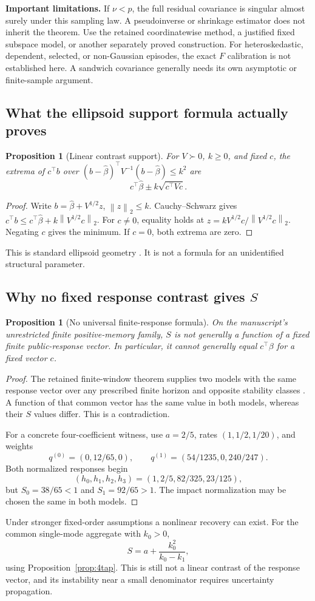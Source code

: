 \documentclass[11pt,a4paper]{article}
\newtheorem{proposition}[theorem]{Proposition}
\theoremstyle{definition}\newtheorem{definition}[theorem]{Definition}
\theoremstyle{remark}\newtheorem{remark}[theorem]{Remark}
\newcommand{\norm}[1]{\left\lVert#1\right\rVert}
\begin{document}
\textbf{Important limitations.} If $\nu<p$, the full residual covariance is singular almost surely under this sampling law. A pseudoinverse or shrinkage estimator does not inherit the theorem. Use the retained coordinatewise method, a justified fixed subspace model, or another separately proved construction. For heteroskedastic, dependent, selected, or non-Gaussian episodes, the exact $F$ calibration is not established here. A sandwich covariance generally needs its own asymptotic or finite-sample argument.

\subsection{What the ellipsoid support formula actually proves}
\begin{proposition}[Linear contrast support]\label{prop:support}
For $V\succ0$, $k\ge0$, and fixed $c$, the extrema of $c^\top b$ over
$(b-\hat\beta)^\top V^{-1}(b-\hat\beta)\le k^2$ are
\[
 c^\top\hat\beta\pm k\sqrt{c^\top Vc}.
\]
\end{proposition}
\begin{proof}
Write $b=\hat\beta+V^{1/2}z$, $\norm z_2\le k$. Cauchy--Schwarz gives
$c^\top b\le c^\top\hat\beta+k\norm{V^{1/2}c}_2$. For $c\ne0$, equality holds at
$z=kV^{1/2}c/\norm{V^{1/2}c}_2$. Negating $c$ gives the minimum. If $c=0$, both extrema are zero.
\end{proof}
This is standard ellipsoid geometry \cite{boyd}. It is not a formula for an unidentified structural parameter.

\subsection{Why no fixed response contrast gives \texorpdfstring{$S$}{S}}
\begin{proposition}[No universal finite-response formula]\label{prop:no-map}
On the manuscript's unrestricted finite positive-memory family, $S$ is not generally a function of a fixed finite public-response vector. In particular, it cannot generally equal $c^\top\beta$ for a fixed vector $c$.
\end{proposition}
\begin{proof}
The retained finite-window theorem supplies two models with the same response vector over any prescribed finite horizon and opposite stability classes \cite[Theorem 8.2]{mm}. A function of that common vector has the same value in both models, whereas their $S$ values differ. This is a contradiction.

For a concrete four-coefficient witness, use $a=2/5$, rates $(1,1/2,1/20)$, and weights
\[
 q^{(0)}=(0,12/65,0),\qquad
 q^{(1)}=(54/1235,0,240/247).
\]
Both normalized responses begin
\[
 (h_0,h_1,h_2,h_3)=(1,2/5,82/325,23/125),
\]
but $S_0=38/65<1$ and $S_1=92/65>1$. The impact normalization may be chosen the same in both models.
\end{proof}
Under stronger fixed-order assumptions a nonlinear recovery can exist. For the common single-mode aggregate with $k_0>0$,
\[
 S=a+\frac{k_0^2}{k_0-k_1},
\]
using Proposition~\ref{prop:4tap}. This is still not a linear contrast of the response vector, and its instability near a small denominator requires uncertainty propagation.
\end{document}
